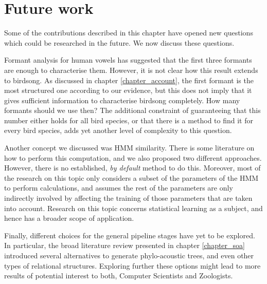 \documentclass[../main.tex]{subfiles}
\begin{document}
\section{Future work} \label{section_future}
Some of the contributions described in this chapter have opened new questions which could be researched in the future. We now discuss these questions.
\par Formant analysis for human vowels has suggested that the first three formants are enough to characterise them. However, it is not clear how this result extends to birdsong. As discussed in chapter \ref{chapter_account}, the first formant is the most structured one according to our evidence, but this does not imply that it gives sufficient information to characterise birdsong completely. How many formants should we use then? The additional constraint of guaranteeing that this number either holds for all bird species, or that there is a method to find it for every bird species, adds yet another level of complexity to this question.
\par Another concept we discussed was HMM similarity. There is some literature on how to perform this computation, and we also proposed two different approaches. However, there is no established, \emph{by default} method to do this. Moreover, most of the research on this topic only considers a subset of the parameters of the HMM to perform calculations, and assumes the rest of the parameters are only indirectly involved by affecting the training of those parameters that are taken into account. Research on this topic concerns statistical learning as a subject, and hence has a broader scope of application.
\par Finally, different choices for the general pipeline stages have yet to be explored. In particular, the broad literature review presented in chapter \ref{chapter_soa} introduced several alternatives to generate phylo-acoustic trees, and even other types of relational structures. Exploring further these options might lead to more results of potential interest to both, Computer Scientists and Zoologists.
\end{document}
